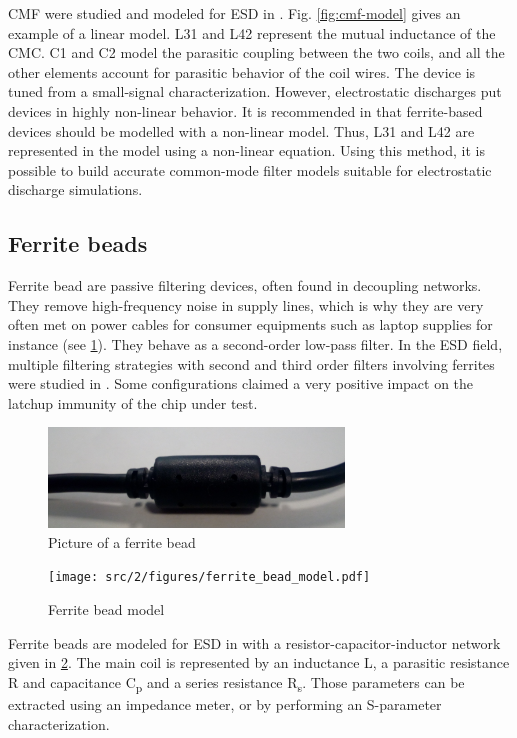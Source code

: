 CMF were studied and modeled for ESD in \cite{usb2ESDProtection}.
Fig. \ref{fig:cmf-model} gives an example of a linear model.
L31 and L42 represent the mutual inductance of the CMC.
C1 and C2 model the parasitic coupling between the two coils, and all the other elements account for parasitic behavior of the coil wires.
The device is tuned from a small-signal characterization.
However, electrostatic discharges put devices in highly non-linear behavior.
It is recommended in \cite{esd-codesign} that ferrite-based devices should be modelled with a non-linear model.
Thus, L31 and L42 are represented in the model using a non-linear equation.
Using this method, it is possible to build accurate common-mode filter models suitable for electrostatic discharge simulations.

\subsection{Ferrite beads}

Ferrite bead are passive filtering devices, often found in  decoupling networks.
They remove high-frequency noise in supply lines, which is why they are very often met on power cables for consumer equipments such as laptop supplies for instance (see \ref{fig:ferrite-bead}).
They behave as a second-order low-pass filter.
In the ESD field, multiple filtering strategies with second and third order filters involving ferrites were studied in \cite{filter-strategies-esd}.
Some configurations claimed a very positive impact on the latchup immunity of the chip under test.

\begin{figure}[!h]
  \centering
  \includegraphics[width=0.7\textwidth]{src/2/figures/ferrite.jpg}
  \caption{Picture of a ferrite bead}
  \label{fig:ferrite-bead}
\end{figure}

\begin{figure}[!h]
  \centering
  \texttt{[image: src/2/figures/ferrite\_bead\_model.pdf]}
  \caption{Ferrite bead model}
  \label{fig:ferrite-model}
\end{figure}

Ferrite beads are modeled for ESD in \cite{mixedModeESDSims} with a resistor-capacitor-inductor network given in \ref{fig:ferrite-model}.
The main coil is represented by an inductance L, a parasitic resistance R and capacitance C\textsubscript{p} and a series resistance R\textsubscript{s}.
Those parameters can be extracted using an impedance meter, or by performing an S-parameter characterization.
